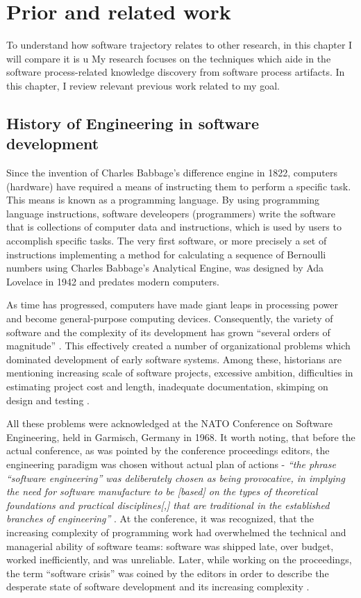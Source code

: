 \chapter{Prior and related work}\label{chapter_background_work}
To understand how software trajectory relates to other research, in this chapter I will compare it is u
My research focuses on the techniques which aide in the software process-related knowledge 
discovery from software process artifacts. In this chapter, I review relevant previous work related to my goal.

\section{History of Engineering in software development}
Since the invention of Charles Babbage’s difference engine in 1822, computers (hardware) 
have required a means of instructing them to perform a specific task. This means is known 
as a programming language. By using programming language instructions, 
software develeopers (programmers) write the software that is collections of computer data 
and instructions, which is used by users to accomplish specific tasks. 
The very first software, or more precisely a set of instructions implementing a method for 
calculating a sequence of Bernoulli numbers using Charles Babbage's Analytical Engine, was 
designed by Ada Lovelace in 1942 and predates modern computers. 

As time has progressed, computers have made giant leaps in processing power and become 
general-purpose computing devices. Consequently, the variety of software and 
the complexity of its development has grown ``several orders of magnitude'' \cite{naur_crisis_68}. 
This effectively created a number of organizational problems which dominated development of 
early software systems. Among these, historians are mentioning increasing scale of software projects, 
excessive ambition, difficulties in estimating project cost and length, inadequate documentation, 
skimping on design and testing \cite{mahoney_roots_1990} \cite{citeulike:12748733} 
\cite{citeulike:833903}.

All these problems were acknowledged at the NATO Conference on Software Engineering, held in Garmisch,
Germany in 1968. It worth noting, that before the actual conference, as was pointed by the 
conference proceedings editors, the engineering paradigm was chosen without actual plan of actions - 
\textit{``the phrase ``software engineering'' was deliberately chosen as being provocative, in implying 
the need for software manufacture to be [based] on the types of theoretical foundations and practical 
disciplines[,] that are traditional in the established branches of engineering''} \cite{citeulike:12787786}.
At the conference, it was recognized, that the increasing complexity of programming 
work had overwhelmed the technical and managerial ability of software teams: software was shipped late,
over budget, worked inefficiently, and was unreliable. Later, while working on the proceedings, the term 
``software crisis'' was coined by the editors in order to describe the desperate state of 
software development and its increasing complexity \cite{naur_crisis_68}.

